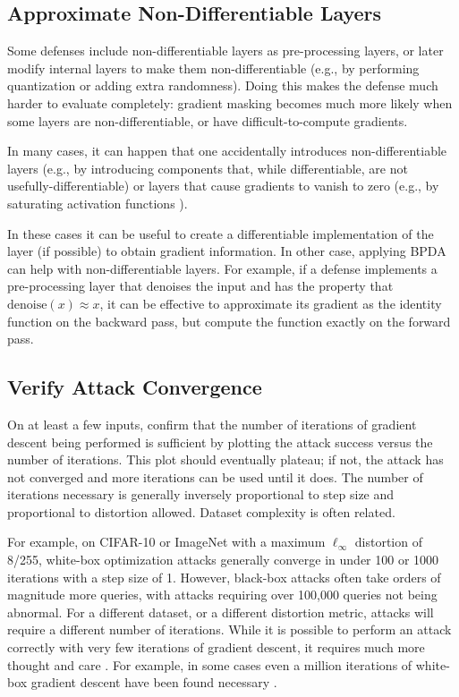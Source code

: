 \documentclass{article} %
\begin{document}
\subsection{Approximate Non-Differentiable Layers}
\label{sec:bpda}

Some defenses include non-differentiable layers as pre-processing
layers, or later modify internal layers to make them non-differentiable
(e.g., by performing quantization or adding extra randomness).
%
Doing this makes the defense much harder to evaluate completely:
gradient masking becomes much more likely when some layers are
non-differentiable, or have difficult-to-compute gradients.

In many cases, it can happen that one accidentally introduces non-differentiable
layers \citep{athalye2018obfuscated} (e.g., by introducing components
that, while differentiable, are not usefully-differentiable) or layers that
cause gradients to vanish to zero (e.g., by saturating
activation functions \citep{brendel2017comment,carlini2016defensive}).

In these cases it can be useful to create a
differentiable implementation of the layer (if possible) to
obtain gradient information.
%
In other case, applying BPDA \citep{athalye2018obfuscated} can help
with non-differentiable layers.
%
For example, if a defense implements a pre-processing layer that
denoises the input and has the property that $\text{denoise}(x) \approx x$,
it can be effective to approximate its gradient as the identity
function on the backward pass, but compute the function exactly
on the forward pass.


\subsection{Verify Attack Convergence}
\label{sec:converge}

On at least a few inputs, confirm
that the number of iterations of gradient descent being performed is
sufficient by plotting the attack success versus the number of
iterations.
%
This plot should eventually plateau; if not, the attack
has not converged and more iterations can be used until
it does.
%
The number of
iterations necessary is generally inversely proportional to step size and
proportional to distortion allowed.
%
Dataset complexity is often related.

For example, on
CIFAR-10 or ImageNet with a maximum $\ell_\infty$ distortion of 8/255,
white-box optimization attacks generally converge in under 100 or 1000
iterations with a step size of 1.
%
However, black-box attacks often take orders of magnitude more queries,
with attacks requiring over 100,000 queries not being abnormal.
%
For a different dataset, or a different
distortion metric, attacks will require a different number of iterations.
%
While it is
possible to perform an attack correctly with very few iterations
of gradient descent, it requires much more thought and care \citep{engstrom2018evaluating}.
%
For example, in some cases even a million iterations of white-box gradient descent
have been found necessary \citep{qian2018l2}.
\end{document}
